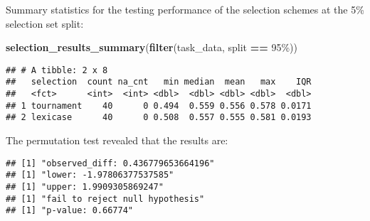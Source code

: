 \documentclass[
]{book}
\newenvironment{Shaded}{\begin{snugshade}}{\end{snugshade}}
\newcommand{\AttributeTok}[1]{\textcolor[rgb]{0.13,0.29,0.53}{#1}}
\newcommand{\DecValTok}[1]{\textcolor[rgb]{0.00,0.00,0.81}{#1}}
\newcommand{\FunctionTok}[1]{\textcolor[rgb]{0.13,0.29,0.53}{\textbf{#1}}}
\newcommand{\NormalTok}[1]{#1}
\newcommand{\OtherTok}[1]{\textcolor[rgb]{0.56,0.35,0.01}{#1}}
\newcommand{\SpecialCharTok}[1]{\textcolor[rgb]{0.81,0.36,0.00}{\textbf{#1}}}
\newcommand{\StringTok}[1]{\textcolor[rgb]{0.31,0.60,0.02}{#1}}
\begin{document}
Summary statistics for the testing performance of the selection schemes at the 5\% selection set split:

\begin{Shaded}
\begin{Highlighting}[]
\FunctionTok{selection\_results\_summary}\NormalTok{(}\FunctionTok{filter}\NormalTok{(task\_data, split }\SpecialCharTok{==} \StringTok{\textquotesingle{}95\%\textquotesingle{}}\NormalTok{))}
\end{Highlighting}
\end{Shaded}

\begin{verbatim}
## # A tibble: 2 x 8
##   selection  count na_cnt   min median  mean   max    IQR
##   <fct>      <int>  <int> <dbl>  <dbl> <dbl> <dbl>  <dbl>
## 1 tournament    40      0 0.494  0.559 0.556 0.578 0.0171
## 2 lexicase      40      0 0.508  0.557 0.555 0.581 0.0193
\end{verbatim}

The permutation test revealed that the results are:

\begin{Shaded}
\end{Shaded}

\begin{verbatim}
## [1] "observed_diff: 0.436779653664196"
## [1] "lower: -1.97806377537585"
## [1] "upper: 1.9909305869247"
## [1] "fail to reject null hypothesis"
## [1] "p-value: 0.66774"
\end{verbatim}
\end{document}
